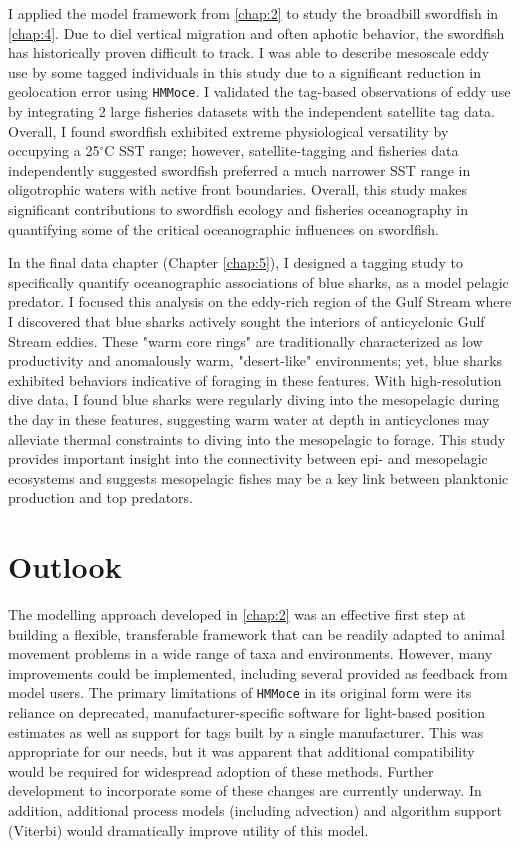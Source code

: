 I applied the model framework from \cref{chap:2} to study the broadbill swordfish in \cref{chap:4}. Due to diel vertical migration and often aphotic behavior, the swordfish has historically proven difficult to track. I was able to describe mesoscale eddy use by some tagged individuals in this study due to a significant reduction in geolocation error using \texttt{HMMoce}. I validated the tag-based observations of eddy use by integrating 2 large fisheries datasets with the independent satellite tag data. Overall, I found swordfish exhibited extreme physiological versatility by occupying a 25$^\circ$C SST range; however, satellite-tagging and fisheries data independently suggested swordfish preferred a much narrower SST range in oligotrophic waters with active front boundaries. Overall, this study makes significant contributions to swordfish ecology and fisheries oceanography in quantifying some of the critical oceanographic influences on swordfish.

In the final data chapter (Chapter \ref{chap:5}), I designed a tagging study to specifically quantify oceanographic associations of blue sharks, as a model pelagic predator. I focused this analysis on the eddy-rich region of the Gulf Stream where I discovered that blue sharks actively sought the interiors of anticyclonic Gulf Stream eddies. These "warm core rings" are traditionally characterized as low productivity and anomalously warm, "desert-like" environments; yet, blue sharks exhibited behaviors indicative of foraging in these features. With high-resolution dive data, I found blue sharks were regularly diving into the mesopelagic during the day in these features, suggesting warm water at depth in anticyclones may alleviate thermal constraints to diving into the mesopelagic to forage. This study provides important insight into the connectivity between epi- and mesopelagic ecosystems and suggests mesopelagic fishes may be a key link between planktonic production and top predators.


\section{Outlook}
The modelling approach developed in \cref{chap:2} was an effective first step at building a flexible, transferable framework that can be readily adapted to animal movement problems in a wide range of taxa and environments. However, many improvements could be implemented, including several provided as feedback from model users. The primary limitations of \texttt{HMMoce} in its original form were its reliance on deprecated, manufacturer-specific software for light-based position estimates as well as support for tags built by a single manufacturer. This was appropriate for our needs, but it was apparent that additional compatibility would be required for widespread adoption of these methods. Further development to incorporate some of these changes are currently underway. In addition, additional process models (\eg including advection) and algorithm support (\eg Viterbi) would dramatically improve utility of this model.

